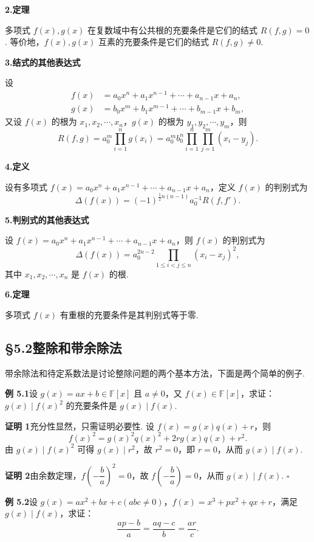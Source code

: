\documentclass[UTF8,12pt,a4paper,fontset=fandol]{ctexart}
\begin{document}
\noindent\textbf{2.\quad 定理}

多项式 $f(x),g(x)$ 在复数域中有公共根的充要条件是它们的结式 $R(f,g)=0$. 等价地，$f(x),g(x)$ 互素的充要条件是它们的结式 $R(f,g)\ne0$.

\noindent\textbf{3.\quad 结式的其他表达式}

设
\[
\begin{aligned}
f(x)&=a_0x^n+a_1x^{n-1}+\cdots+a_{n-1}x+a_n,\\
g(x)&=b_0x^m+b_1x^{m-1}+\cdots+b_{m-1}x+b_m,
\end{aligned}
\]
又设 $f(x)$ 的根为 $x_1,x_2,\cdots,x_n$，$g(x)$ 的根为 $y_1,y_2,\cdots,y_m$，则
\[
R(f,g)=a_0^m\prod_{i=1}^n g(x_i)
=a_0^m b_0^n\prod_{i=1}^n\prod_{j=1}^m(x_i-y_j).
\]

\noindent\textbf{4.\quad 定义}

设有多项式 $f(x)=a_0x^n+a_1x^{n-1}+\cdots+a_{n-1}x+a_n$，定义 $f(x)$ 的判别式为
\[
\Delta(f(x))=(-1)^{\frac12 n(n-1)}a_0^{-1}R(f,f').
\]

\noindent\textbf{5.\quad 判别式的其他表达式}

设 $f(x)=a_0x^n+a_1x^{n-1}+\cdots+a_{n-1}x+a_n$，则 $f(x)$ 的判别式为
\[
\Delta(f(x))=a_0^{2n-2}\prod_{1\le i<j\le n}(x_i-x_j)^2,
\]
其中 $x_1,x_2,\cdots,x_n$ 是 $f(x)$ 的根.

\noindent\textbf{6.\quad 定理}

多项式 $f(x)$ 有重根的充要条件是其判别式等于零.

\subsection*{§5.2\quad 整除和带余除法}

带余除法和待定系数法是讨论整除问题的两个基本方法，下面是两个简单的例子.

\noindent\textbf{例 5.1}\quad 设 $g(x)=ax+b\in\mathbb{F}[x]$ 且 $a\ne0$，又 $f(x)\in\mathbb{F}[x]$，求证：$g(x)\mid f(x)^2$ 的充要条件是 $g(x)\mid f(x)$.

\noindent\textbf{证明 1}\quad 充分性显然，只需证明必要性. 设 $f(x)=g(x)q(x)+r$，则
\[
f(x)^2=g(x)^2q(x)^2+2rg(x)q(x)+r^2.
\]
由 $g(x)\mid f(x)^2$ 可得 $g(x)\mid r^2$，故 $r^2=0$，即 $r=0$，从而 $g(x)\mid f(x)$.

\noindent\textbf{证明 2}\quad 由余数定理，$f\left(-\dfrac{b}{a}\right)^2=0$，故 $f\left(-\dfrac{b}{a}\right)=0$，从而 $g(x)\mid f(x)$. \hfill $\square$

\noindent\textbf{例 5.2}\quad 设 $g(x)=ax^2+bx+c(abc\ne0)$，$f(x)=x^3+px^2+qx+r$，满足 $g(x)\mid f(x)$，求证：
\[
\frac{ap-b}{a}=\frac{aq-c}{b}=\frac{ar}{c}.
\]
\end{document}
